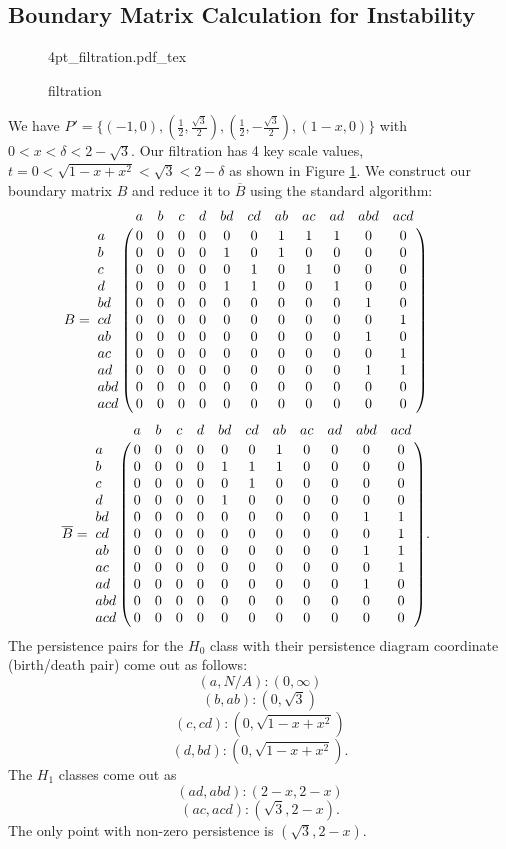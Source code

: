\documentclass[letterpaper,titlepage]{article}
\newcommand{\incfig}[1]{%
    {#1.pdf_tex}
}
\begin{document}
\subsection{Boundary Matrix Calculation for Instability}\label{boundary_mat}

\begin{figure}[ht]
    \centering
    \def\svgwidth{\columnwidth}
    \incfig{4pt_filtration}
    \caption{filtration}
    \label{fig:4pt_filtration}
\end{figure}

We have $P' = \{(-1,0),(\frac{1}{2},\frac{\sqrt{3}}{2}),(\frac{1}{2},-\frac{\sqrt{3}}{2}),(1-x,0)\}$ with $0< x < \delta < 2-\sqrt{3}$.
Our filtration has 4 key scale values, $t = 0<\sqrt{1-x+x^2}< \sqrt{3}< 2-\delta$ as shown in Figure \ref{fig:4pt_filtration}. We construct our boundary matrix $B$ and reduce it to $\overline{B}$ using the standard algorithm:
$$B=\bordermatrix{ 
    &   a & b & c & d & bd & cd & ab & ac & ad & abd & acd\cr
    a & 0 & 0 & 0 & 0 &  0 &  0 &  1 &  1 &  1 &   0 &   0 \cr
    b & 0 & 0 & 0 & 0 &  1 &  0 &  1 &  0 &  0 &   0 &   0\cr
    c & 0 & 0 & 0 & 0 &  0 &  1 &  0 &  1 &  0 &   0 &   0\cr
    d & 0 & 0 & 0 & 0 &  1 &  1 &  0 &  0 &  1 &   0 &   0\cr
   bd & 0 & 0 & 0 & 0 &  0 &  0 &  0 &  0 &  0 &   1 &   0\cr
   cd & 0 & 0 & 0 & 0 &  0 &  0 &  0 &  0 &  0 &   0 &   1\cr
   ab & 0 & 0 & 0 & 0 &  0 &  0 &  0 &  0 &  0 &   1 &   0\cr
   ac & 0 & 0 & 0 & 0 &  0 &  0 &  0 &  0 &  0 &   0 &   1\cr
   ad & 0 & 0 & 0 & 0 &  0 &  0 &  0 &  0 &  0 &   1 &   1\cr
  abd & 0 & 0 & 0 & 0 &  0 &  0 &  0 &  0 &  0 &   0 &   0\cr
  acd & 0 & 0 & 0 & 0 &  0 &  0 &  0 &  0 &  0 &   0 &   0\cr
    } \qquad$$
$$\overline{B}=\bordermatrix{ 
    &   a & b & c & d & bd & cd & ab & ac & ad & abd & acd\cr
    a & 0 & 0 & 0 & 0 &  0 &  0 &  1 &  0 &  0 &   0 &   0 \cr
    b & 0 & 0 & 0 & 0 &  1 &  1 &  1 &  0 &  0 &   0 &   0\cr
    c & 0 & 0 & 0 & 0 &  0 &  1 &  0 &  0 &  0 &   0 &   0\cr
    d & 0 & 0 & 0 & 0 &  1 &  0 &  0 &  0 &  0 &   0 &   0\cr
   bd & 0 & 0 & 0 & 0 &  0 &  0 &  0 &  0 &  0 &   1 &   1\cr
   cd & 0 & 0 & 0 & 0 &  0 &  0 &  0 &  0 &  0 &   0 &   1\cr
   ab & 0 & 0 & 0 & 0 &  0 &  0 &  0 &  0 &  0 &   1 &   1\cr
   ac & 0 & 0 & 0 & 0 &  0 &  0 &  0 &  0 &  0 &   0 &   1\cr
   ad & 0 & 0 & 0 & 0 &  0 &  0 &  0 &  0 &  0 &   1 &   0\cr
  abd & 0 & 0 & 0 & 0 &  0 &  0 &  0 &  0 &  0 &   0 &   0\cr
  acd & 0 & 0 & 0 & 0 &  0 &  0 &  0 &  0 &  0 &   0 &   0\cr
    }. \qquad$$
The persistence pairs for the $H_0$ class with their persistence diagram coordinate (birth/death pair) come out as follows:
$$(a,N/A): (0,\infty)$$
$$(b,ab): (0,\sqrt{3})$$
$$(c, cd): (0,\sqrt{1-x+x^2})$$
$$(d, bd): (0,\sqrt{1-x+x^2}).$$
The $H_1$ classes come out as
$$(ad, abd): (2-x, 2-x)$$
$$(ac, acd): (\sqrt{3}, 2-x).$$
The only point with non-zero persistence is $(\sqrt{3}, 2-x).$
\end{document}
